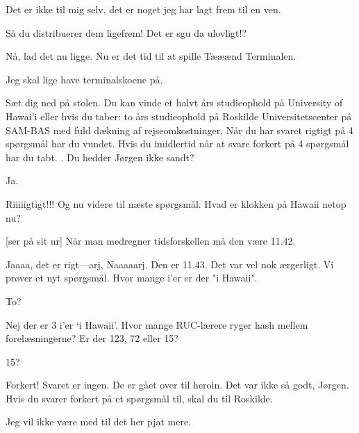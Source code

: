 \documentclass[10pt]{article}
\begin{document}
\begin{sketch}
 Det er ikke til mig selv, det er noget jeg har lagt
frem til en ven.

 Så du distribuerer dem ligefrem! Det er sgu da ulovligt!?


 Nå, lad det nu ligge. 
  Nu er det tid til at spille Tææænd Terminalen.


 Jeg skal lige have terminalskoene på.


 Sæt dig ned på stolen. Du kan vinde et halvt års studieophold
på University of Hawai'i eller hvis du taber: to års studieophold på
Roskilde Universitetscenter på SAM-BAS med fuld dækning af rejseomkostninger, 
Når du har svaret rigtigt på 4 spørgsmål har du
vundet.  Hvis du imidlertid når at svare forkert på 4 spørgsmål har du
tabt. . Du hedder Jørgen ikke sandt?

 Ja.

 Riiiiigtigt!!! Og nu videre til næste spørgsmål.
Hvad er klokken på Hawaii netop nu?

[ser på sit ur] Når man medregner tidsforskellen må den
være 11.42.

 Jaaaa, det er rigt----arj,
Naaaaarj. Den er 11.43. Det var vel nok ærgerligt.  Vi prøver et nyt
spørgsmål. Hvor mange i'er er der "i Hawaii".

 To?

 Nej der er 3 i'er `i Hawaii'.  Hvor mange RUC-lærere 
ryger hash mellem forelæsningerne? Er der 123, 72 eller 15?

 15?

 Forkert! Svaret er ingen. De er gået over til heroin.
Det var ikke så godt, Jørgen. Hvis du svarer forkert på et
spørgsmål til, skal du til Roskilde.

 Jeg vil ikke være med til det her pjat mere.


\end{sketch}
\end{document}
